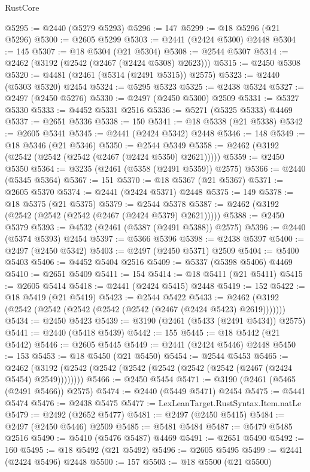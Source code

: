 \begin{lexlean}{RustCore}
\begin{coremodule}
@5295 := @2440 (@5279 @5293)
@5296 := 147
@5299 := @18 @5296 (@21 @5296)
@5300 := @2605 @5299
@5303 := @2441 (@2424 @5300) @2448
@5304 := 145
@5307 := @18 @5304 (@21 @5304)
@5308 := @2544 @5307
@5314 := @2462 (@3192 (@2542 (@2467 (@2424 @5308) @2623)))
@5315 := @2450 @5308
@5320 := @4481 (@2461 (@5314 (@2491 @5315)) @2575)
@5323 := @2440 (@5303 @5320) @2454
@5324 := @5295 @5323
@5325 := @2438 @5324
@5327 := @2497 (@2450 @5276)
@5330 := @2497 (@2450 @5300) @2509
@5331 := @5327 @5330
@5333 := @4452 @5331 @2516
@5336 := @5271 (@5325 @5333) @4469
@5337 := @2651 @5336
@5338 := 150
@5341 := @18 @5338 (@21 @5338)
@5342 := @2605 @5341
@5345 := @2441 (@2424 @5342) @2448
@5346 := 148
@5349 := @18 @5346 (@21 @5346)
@5350 := @2544 @5349
@5358 := @2462 (@3192 (@2542 (@2542 (@2542 (@2467 (@2424 @5350) @2621)))))
@5359 := @2450 @5350
@5364 := @3235 (@2461 (@5358 (@2491 @5359)) @2575)
@5366 := @2440 (@5345 @5364)
@5367 := 151
@5370 := @18 @5367 (@21 @5367)
@5371 := @2605 @5370
@5374 := @2441 (@2424 @5371) @2448
@5375 := 149
@5378 := @18 @5375 (@21 @5375)
@5379 := @2544 @5378
@5387 := @2462 (@3192 (@2542 (@2542 (@2542 (@2467 (@2424 @5379) @2621)))))
@5388 := @2450 @5379
@5393 := @4532 (@2461 (@5387 (@2491 @5388)) @2575)
@5396 := @2440 (@5374 @5393) @2454
@5397 := @5366 @5396
@5398 := @2438 @5397
@5400 := @2497 (@2450 @5342)
@5403 := @2497 (@2450 @5371) @2509
@5404 := @5400 @5403
@5406 := @4452 @5404 @2516
@5409 := @5337 (@5398 @5406) @4469
@5410 := @2651 @5409
@5411 := 154
@5414 := @18 @5411 (@21 @5411)
@5415 := @2605 @5414
@5418 := @2441 (@2424 @5415) @2448
@5419 := 152
@5422 := @18 @5419 (@21 @5419)
@5423 := @2544 @5422
@5433 := @2462 (@3192 (@2542 (@2542 (@2542 (@2542 (@2542 (@2467 (@2424 @5423) @2619)))))))
@5434 := @2450 @5423
@5439 := @3190 (@2461 (@5433 (@2491 @5434)) @2575)
@5441 := @2440 (@5418 @5439)
@5442 := 155
@5445 := @18 @5442 (@21 @5442)
@5446 := @2605 @5445
@5449 := @2441 (@2424 @5446) @2448
@5450 := 153
@5453 := @18 @5450 (@21 @5450)
@5454 := @2544 @5453
@5465 := @2462 (@3192 (@2542 (@2542 (@2542 (@2542 (@2542 (@2542 (@2467 (@2424 @5454) @2549))))))))
@5466 := @2450 @5454
@5471 := @3190 (@2461 (@5465 (@2491 @5466)) @2575)
@5474 := @2440 (@5449 @5471) @2454
@5475 := @5441 @5474
@5476 := @2438 @5475
@5477 := LexLeanTarget.RustSyntax.Item.natLe
@5479 := @2492 (@2652 @5477)
@5481 := @2497 (@2450 @5415)
@5484 := @2497 (@2450 @5446) @2509
@5485 := @5481 @5484
@5487 := @5479 @5485 @2516
@5490 := @5410 (@5476 @5487) @4469
@5491 := @2651 @5490
@5492 := 160
@5495 := @18 @5492 (@21 @5492)
@5496 := @2605 @5495
@5499 := @2441 (@2424 @5496) @2448
@5500 := 157
@5503 := @18 @5500 (@21 @5500)

\end{coremodule}
\end{lexlean}
